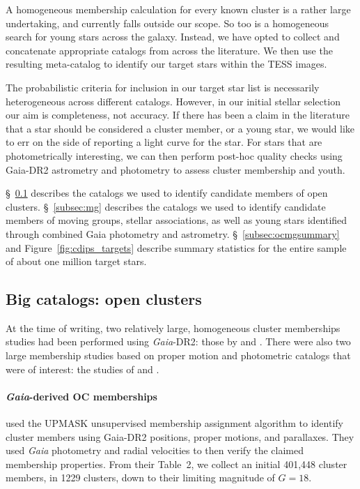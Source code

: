 \documentclass[12pt,twocolumn,tighten]{aastex62}
\begin{document}
A homogeneous membership calculation for every known cluster is a
rather large undertaking, and currently falls outside our scope.  So
too is a homogeneous search for young stars across the galaxy.
Instead, we have opted to collect and concatenate appropriate catalogs
from across the literature.  We then use the resulting meta-catalog to
identify our target stars within the TESS images.

The probabilistic criteria for inclusion in our target star list is
necessarily heterogeneous across different catalogs.  However, in our
initial stellar selection our aim is completeness, not accuracy.  If
there has been a claim in the literature that a star should be
considered a cluster member, or a young star, we would like to err on
the side of reporting a light curve for the star.  For stars that are
photometrically interesting, we can then perform post-hoc quality
checks using Gaia-DR2 astrometry and photometry to assess cluster
membership and youth.

\S~\ref{subsec:oc} describes the catalogs we used to identify
candidate members of open clusters.  \S~\ref{subsec:mg} describes the
catalogs we used to identify candidate members of moving groups,
stellar associations, as well as young stars identified through
combined Gaia photometry and astrometry.  \S~\ref{subsec:ocmgsummary}
and Figure~\ref{fig:cdips_targets} describe summary statistics for the
entire sample of about one million target stars.


\subsection{Big catalogs: open clusters}
\label{subsec:oc}

At the time of writing, two relatively large, homogeneous cluster
memberships studies had been performed using {\it Gaia}-DR2: those by
\citet{cantat-gaudin_gaia_2018} and \citet{gaia_hr_2018}.
There were also two large membership studies based on proper motion and 
photometric catalogs that were of interest: the studies of
\citet{Kharchenko_et_al_2013} and \citet{dias_proper_2014}.

\paragraph{{\it Gaia}-derived OC memberships}

\citet{cantat-gaudin_gaia_2018} used the UPMASK unsupervised membership
assignment algorithm \citep{krone-martins_upmask_2014} to identify cluster
members using Gaia-DR2 positions, proper motions, and parallaxes.
They used {\it Gaia} photometry and radial velocities to then verify the
claimed membership properties.  From their Table~2, we collect an initial
401{,}448 cluster members, in 1229 clusters, down to their limiting magnitude
of $G=18$.
\end{document}
